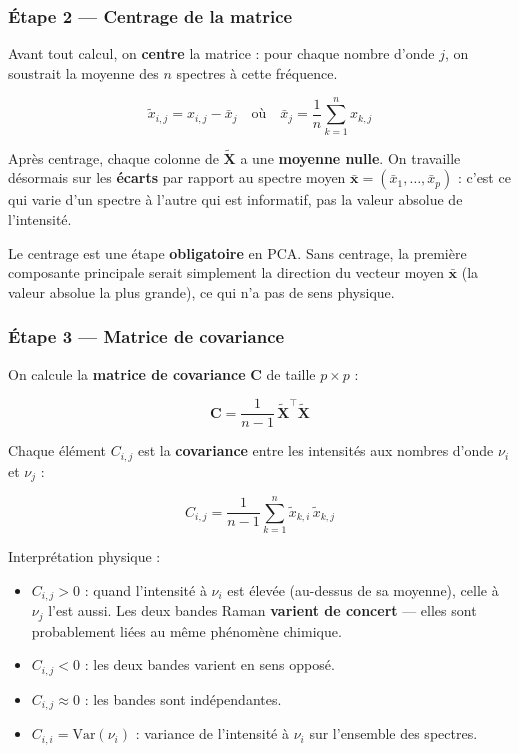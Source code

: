 \documentclass[12pt, a4paper]{article}
\newcommand{\Xc}{\tilde{\mathbf{X}}}
\newcommand{\C}{\mathbf{C}}
\newcommand{\xbar}{\bar{\mathbf{x}}}
\begin{document}
\subsubsection{Étape 2 --- Centrage de la matrice}

Avant tout calcul, on \textbf{centre} la matrice : pour chaque nombre d'onde
$j$, on soustrait la moyenne des $n$ spectres à cette fréquence.

\[
\tilde{x}_{i,j} = x_{i,j} - \bar{x}_j
\quad \text{où} \quad
\bar{x}_j = \frac{1}{n} \sum_{k=1}^{n} x_{k,j}
\]

Après centrage, chaque colonne de $\Xc$ a une \textbf{moyenne nulle}. On
travaille désormais sur les \textbf{écarts} par rapport au spectre moyen
$\xbar = (\bar{x}_1, \ldots, \bar{x}_p)$ : c'est ce qui varie d'un spectre
à l'autre qui est informatif, pas la valeur absolue de l'intensité.

\begin{remarque}
Le centrage est une étape \textbf{obligatoire} en PCA. Sans centrage, la
première composante principale serait simplement la direction du vecteur
moyen $\xbar$ (la valeur absolue la plus grande), ce qui n'a pas de sens
physique.
\end{remarque}

\subsubsection{Étape 3 --- Matrice de covariance}

On calcule la \textbf{matrice de covariance} $\C$ de taille $p \times p$ :

\[
\C = \frac{1}{n-1}\, \Xc^\top \Xc
\]

Chaque élément $C_{i,j}$ est la \textbf{covariance} entre les intensités aux
nombres d'onde $\nu_i$ et $\nu_j$ :

\[
C_{i,j} = \frac{1}{n-1} \sum_{k=1}^{n} \tilde{x}_{k,i}\,\tilde{x}_{k,j}
\]

Interprétation physique :

\begin{itemize}
  \item $C_{i,j} > 0$ : quand l'intensité à $\nu_i$ est élevée (au-dessus de
        sa moyenne), celle à $\nu_j$ l'est aussi. Les deux bandes Raman
        \textbf{varient de concert} — elles sont probablement liées au même
        phénomène chimique.
  \item $C_{i,j} < 0$ : les deux bandes varient en sens opposé.
  \item $C_{i,j} \approx 0$ : les bandes sont indépendantes.
  \item $C_{i,i} = \text{Var}(\nu_i)$ : variance de l'intensité à $\nu_i$
        sur l'ensemble des spectres.
\end{itemize}
\end{document}
